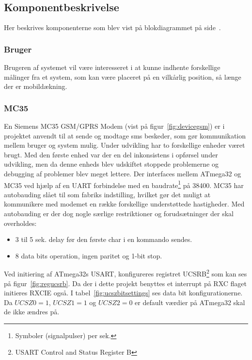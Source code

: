 \subsection{Komponentbeskrivelse}\label{sec:blockdescription}
Her beskrives komponenterne som blev vist på blokdiagrammet på side~\pageref{fig:blockdiagram}. 

\subsubsection{Bruger}
Brugeren af systemet vil være interesseret i at kunne indhente forskellige målinger fra et system, som kan være placeret på en vilkårlig position, så længe der er mobildækning.

\subsubsection{MC35}
En Siemens MC35 GSM/GPRS Modem (vist på figur~\ref{fig:devicegsm}) er i projektet anvendt til at sende og modtage sms beskeder, som gør kommunikation mellem bruger og system mulig. Under udvikling har to forskellige enheder været brugt. Med den første enhed var der en del inkonsistens i opførsel under udvikling, men da denne enheds blev udskiftet stoppede problemerne og debugging af problemer blev meget lettere.
Der interfaces mellem ATmega32 og MC35 ved hjælp af en UART forbindelse med en baudrate\footnote{Symboler (signalpulser) per sek.} på 38400.
MC35 har autobauding slået til som fabriks indstilling, hvilket gør det muligt at kommunikere med modemet en række forskellige understøttede hastigheder.
Med autobauding er der dog nogle særlige restriktioner og forudsætninger der skal overholdes:

\begin{itemize}
	\item 3 til 5 sek. delay før den første char i en kommando sendes.
	\item 8 data bits operation, ingen paritet og 1-bit stop.
\end{itemize}

Ved initiering af ATmega32s USART, konfigureres registret UCSRB\footnote{USART Control and Status Register B} 
som kan ses på figur~\ref{fig:regucsrb}. Da der i dette projekt benyttes et interrupt på RXC flaget initieres RXCIE også.
I tabel~\ref{fig:ucszbitsettings} ses data bit konfigurationerne. Da $UCSZ0=1$, $UCSZ1=1$ og $UCSZ2=0$ er default værdier på 
ATmega32 skal de ikke ændres på.



